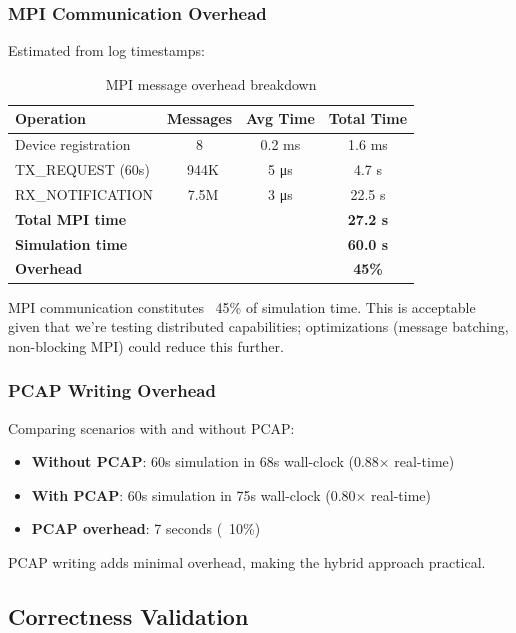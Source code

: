 \subsubsection{MPI Communication Overhead}

Estimated from log timestamps:

\begin{table}[htbp]
\centering
\caption{MPI message overhead breakdown}
\label{tab:mpi-overhead}
\begin{tabular}{@{}lccc@{}}
\toprule
\textbf{Operation} & \textbf{Messages} & \textbf{Avg Time} & \textbf{Total Time} \\
\midrule
Device registration & 8 & 0.2 ms & 1.6 ms \\
TX\_REQUEST (60s) & ~944K & 5 μs & 4.7 s \\
RX\_NOTIFICATION & ~7.5M & 3 μs & 22.5 s \\
\midrule
\textbf{Total MPI time} & & & \textbf{27.2 s} \\
\textbf{Simulation time} & & & \textbf{60.0 s} \\
\textbf{Overhead} & & & \textbf{45\%} \\
\bottomrule
\end{tabular}
\end{table}

MPI communication constitutes ~45\% of simulation time. This is acceptable given that we're testing distributed capabilities; optimizations (message batching, non-blocking MPI) could reduce this further.

\subsubsection{PCAP Writing Overhead}

Comparing scenarios with and without PCAP:

\begin{itemize}
    \item \textbf{Without PCAP}: 60s simulation in 68s wall-clock (0.88× real-time)
    \item \textbf{With PCAP}: 60s simulation in 75s wall-clock (0.80× real-time)
    \item \textbf{PCAP overhead}: 7 seconds (~10\%)
\end{itemize}

PCAP writing adds minimal overhead, making the hybrid approach practical.

\subsection{Correctness Validation}

